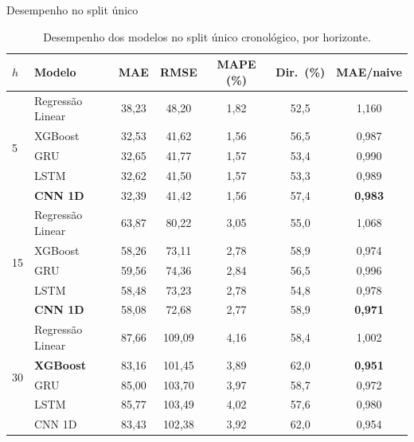 \documentclass{libs/ufc_format}
\begin{document}
\begin{frame}{Desempenho no split único}
    \scriptsize
    \begin{table}
    \centering
    \caption{Desempenho dos modelos no split único cronológico, por horizonte.}
    \begin{tabular}{llccccc}
        \toprule
        \(h\) & \textbf{Modelo} & \textbf{MAE} & \textbf{RMSE} & \textbf{MAPE (\%)} & \textbf{Dir.\ (\%)} & \textbf{MAE/naive} \\
        \midrule
        \multirow{5}{*}{5}
          & Regressão Linear & 38{,}23 & 48{,}20 & 1{,}82 & 52{,}5 & 1{,}160 \\
          & XGBoost          & 32{,}53 & 41{,}62 & 1{,}56 & 56{,}5 & 0{,}987 \\
          & GRU              & 32{,}65 & 41{,}77 & 1{,}57 & 53{,}4 & 0{,}990 \\
          & LSTM             & 32{,}62 & 41{,}50 & 1{,}57 & 53{,}3 & 0{,}989 \\
          & \textbf{CNN 1D}  & 32{,}39 & 41{,}42 & 1{,}56 & 57{,}4 & \textbf{0{,}983} \\
        \midrule
        \multirow{5}{*}{15}
          & Regressão Linear & 63{,}87 & 80{,}22 & 3{,}05 & 55{,}0 & 1{,}068 \\
          & XGBoost          & 58{,}26 & 73{,}11 & 2{,}78 & 58{,}9 & 0{,}974 \\
          & GRU              & 59{,}56 & 74{,}36 & 2{,}84 & 56{,}5 & 0{,}996 \\
          & LSTM             & 58{,}48 & 73{,}23 & 2{,}78 & 54{,}8 & 0{,}978 \\
          & \textbf{CNN 1D}  & 58{,}08 & 72{,}68 & 2{,}77 & 58{,}9 & \textbf{0{,}971} \\
        \midrule
        \multirow{5}{*}{30}
          & Regressão Linear & 87{,}66 & 109{,}09 & 4{,}16 & 58{,}4 & 1{,}002 \\
          & \textbf{XGBoost} & 83{,}16 & 101{,}45 & 3{,}89 & 62{,}0 & \textbf{0{,}951} \\
          & GRU              & 85{,}00 & 103{,}70 & 3{,}97 & 58{,}7 & 0{,}972 \\
          & LSTM             & 85{,}77 & 103{,}49 & 4{,}02 & 57{,}6 & 0{,}980 \\
          & CNN 1D           & 83{,}43 & 102{,}38 & 3{,}92 & 62{,}0 & 0{,}954 \\
        \bottomrule
    \end{tabular}
    \end{table}
\end{frame}
\end{document}
